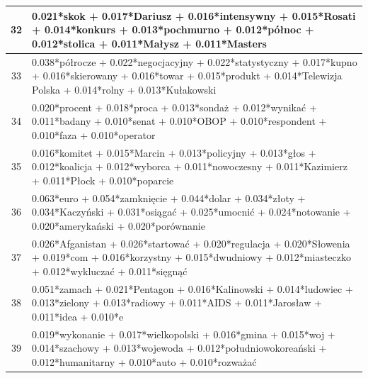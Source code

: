 \documentclass[11pt,a4paper]{article}
\begin{document}
\begin{table}[h]
\begin{tabular}{|c|>{\footnotesize}p{\linewidth}|}
32 & 0.021*skok + 0.017*Dariusz + 0.016*intensywny + 0.015*Rosati + 0.014*konkurs + 0.013*pochmurno + 0.012*północ + 0.012*stolica + 0.011*Małysz + 0.011*Masters\\\hline
33 & 0.038*półrocze + 0.022*negocjacyjny + 0.022*statystyczny + 0.017*kupno + 0.016*skierowany + 0.016*towar + 0.015*produkt + 0.014*Telewizja Polska + 0.014*rolny + 0.013*Kułakowski\\\hline
34 & 0.020*procent + 0.018*proca + 0.013*sondaż + 0.012*wynikać + 0.011*badany + 0.010*senat + 0.010*OBOP + 0.010*respondent + 0.010*faza + 0.010*operator\\\hline
35 & 0.016*komitet + 0.015*Marcin + 0.013*policyjny + 0.013*głos + 0.012*koalicja + 0.012*wyborca + 0.011*nowoczesny + 0.011*Kazimierz + 0.011*Płock + 0.010*poparcie\\\hline
36 & 0.063*euro + 0.054*zamknięcie + 0.044*dolar + 0.034*złoty + 0.034*Kaczyński + 0.031*osiągać + 0.025*umocnić + 0.024*notowanie + 0.020*amerykański + 0.020*porównanie\\\hline
37 & 0.026*Afganistan + 0.026*startować + 0.020*regulacja + 0.020*Słowenia + 0.019*com + 0.016*korzystny + 0.015*dwudniowy + 0.012*miasteczko + 0.012*wykluczać + 0.011*sięgnąć\\\hline
38 & 0.051*zamach + 0.021*Pentagon + 0.016*Kalinowski + 0.014*ludowiec + 0.013*zielony + 0.013*radiowy + 0.011*AIDS + 0.011*Jarosław + 0.011*idea + 0.010*e\\\hline
39 & 0.019*wykonanie + 0.017*wielkopolski + 0.016*gmina + 0.015*woj + 0.014*szachowy + 0.013*wojewoda + 0.012*południowokoreański + 0.012*humanitarny + 0.010*auto + 0.010*rozważać\\\hline

\end{tabular}
\end{table}
\end{document}

